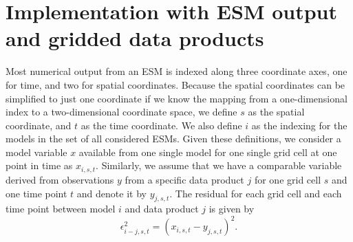 \documentclass[gmd, manuscript]{copernicus}
\begin{document}

\section{Implementation with ESM output and gridded data products}
Most numerical output from an ESM is indexed along three coordinate axes, one for time, and two for spatial coordinates. Because the spatial coordinates can be simplified to just one coordinate if we know the mapping from a one-dimensional index to a two-dimensional coordinate space, we define $s$ as the spatial coordinate, and $t$ as the time coordinate. We also define $i$ as the indexing for the models in the set of all considered ESMs. Given these definitions, we consider a model variable $x$ available from one single model for one single grid cell at one point in time as $x_{i, s, t}$. Similarly, we assume that we have a comparable variable derived from observations $y$ from a specific data product $j$ for one grid cell $s$ and one time point $t$ and denote it by $y_{j, s, t}$. The residual for each grid cell and each time point between model $i$ and data product $j$ is given by
\begin{equation}
\epsilon_{i-j, s, t}^2 =  (x_{i, s, t} - y_{j, s, t})^2.
\end{equation}
\end{document}
